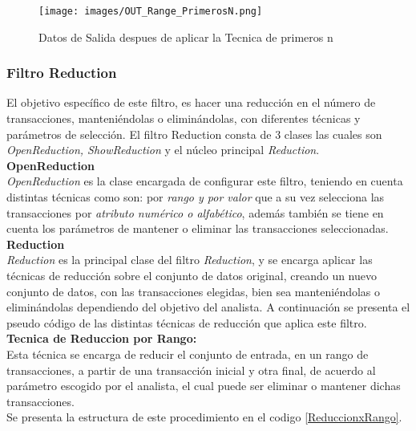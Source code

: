 \begin{figure}[h]
\centering
\texttt{[image: images/OUT\_Range\_PrimerosN.png]}
\caption{Datos de Salida despues de aplicar la Tecnica de primeros n}
\label{primerosN}
\end{figure}

\subsubsection{Filtro  Reduction}
El objetivo espec\'ifico de este filtro, es hacer una reducci\'on en el n\'umero de transacciones, manteni\'endolas o elimin\'andolas, con diferentes t\'ecnicas y par\'ametros de selecci\'on.
El filtro  Reduction consta de 3 clases las cuales son \textit{OpenReduction, ShowReduction} y el n\'ucleo principal  \textit{Reduction}.\\

\textbf{OpenReduction} \\
\textit{OpenReduction} es la clase encargada de configurar este filtro, teniendo en cuenta distintas t\'ecnicas como son: por \textit{rango y por valor} que a su vez selecciona las transacciones por \textit{atributo num\'erico o alfab\'etico}, adem\'as tambi\'en se tiene en cuenta los par\'ametros de mantener o eliminar las transacciones seleccionadas.\\

\textbf{Reduction} \\
\textit{Reduction} es la principal clase del filtro \textit{Reduction}, y se encarga aplicar las t\'ecnicas de reducci\'on sobre el conjunto de datos original, creando un nuevo conjunto de datos,  con las transacciones elegidas, bien sea manteni\'endolas o elimin\'andolas dependiendo del objetivo del analista.
A continuaci\'on se presenta el pseudo c\'odigo de las distintas t\'ecnicas de reducci\'on que aplica este filtro. \\

\textbf{Tecnica de Reduccion por Rango:} \\
Esta t\'ecnica se encarga de reducir el conjunto de entrada, en un rango de transacciones, a partir de una transacci\'on inicial y otra final, de acuerdo al par\'ametro escogido por el analista, el cual puede ser eliminar o mantener dichas transacciones. \\ 
Se presenta la estructura de este procedimiento en el codigo \ref{ReduccionxRango}. \\

